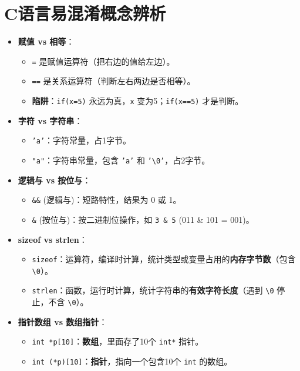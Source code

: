 \documentclass[a4paper,12pt]{article}
\begin{document}
\section{C语言易混淆概念辨析}

\begin{itemize}
    \item \textbf{赋值 vs 相等}：
    \begin{itemize}
        \item \texttt{=} 是赋值运算符（把右边的值给左边）。
        \item \texttt{==} 是关系运算符（判断左右两边是否相等）。
        \item \textbf{陷阱}：\texttt{if(x=5)} 永远为真，\texttt{x} 变为5；\texttt{if(x==5)} 才是判断。
    \end{itemize}

    \item \textbf{字符 vs 字符串}：
    \begin{itemize}
        \item \texttt{'a'}：字符常量，占1字节。
        \item \texttt{"a"}：字符串常量，包含 \texttt{'a'} 和 \texttt{'\textbackslash 0'}，占2字节。
    \end{itemize}

    \item \textbf{逻辑与 vs 按位与}：
    \begin{itemize}
        \item \texttt{\&\&} (逻辑与)：短路特性，结果为 0 或 1。
        \item \texttt{\&} (按位与)：按二进制位操作，如 \texttt{3 \& 5} (011 \& 101 = 001)。
    \end{itemize}

    \item \textbf{sizeof vs strlen}：
    \begin{itemize}
        \item \texttt{sizeof}：运算符，编译时计算，统计类型或变量占用的\textbf{内存字节数}（包含 \texttt{\textbackslash 0}）。
        \item \texttt{strlen}：函数，运行时计算，统计字符串的\textbf{有效字符长度}（遇到 \texttt{\textbackslash 0} 停止，不含 \texttt{\textbackslash 0}）。
    \end{itemize}

    \item \textbf{指针数组 vs 数组指针}：
    \begin{itemize}
        \item \texttt{int *p[10]}：\textbf{数组}，里面存了10个 \texttt{int*} 指针。
        \item \texttt{int (*p)[10]}：\textbf{指针}，指向一个包含10个 \texttt{int} 的数组。
    \end{itemize}


\end{itemize}
\end{document}
